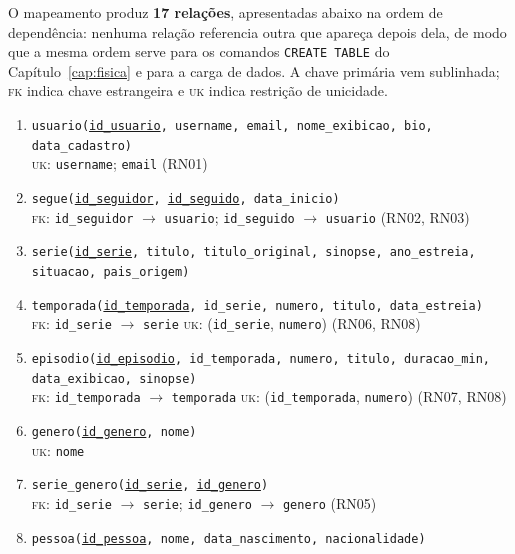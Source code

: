 \documentclass[a4paper,12pt,oneside,openany]{book}
\newcommand{\id}[1]{\texttt{#1}}
\begin{document}
O mapeamento produz \textbf{17 relações}, apresentadas abaixo na ordem de
dependência: nenhuma relação referencia outra que apareça depois dela, de modo que a
mesma ordem serve para os comandos \id{CREATE TABLE} do Capítulo~\ref{cap:fisica} e
para a carga de dados. A chave primária vem sublinhada; \textsc{fk} indica chave
estrangeira e \textsc{uk} indica restrição de unicidade.

\begin{enumerate}[leftmargin=2em]
    \item \id{usuario(\underline{id\_usuario}, username, email, nome\_exibicao, bio, data\_cadastro)}\\
    \textsc{uk}: \id{username}; \id{email} \hfill (RN01)

    \item \id{segue(\underline{id\_seguidor}, \underline{id\_seguido}, data\_inicio)}\\
    \textsc{fk}: \id{id\_seguidor} $\rightarrow$ \id{usuario}; \id{id\_seguido}
$\rightarrow$ \id{usuario} \hfill (RN02, RN03)

    \item \id{serie(\underline{id\_serie}, titulo, titulo\_original, sinopse,
ano\_estreia, situacao, pais\_origem)}

    \item \id{temporada(\underline{id\_temporada}, id\_serie, numero, titulo, data\_estreia)}\\
    \textsc{fk}: \id{id\_serie} $\rightarrow$ \id{serie} \quad \textsc{uk}:
(\id{id\_serie}, \id{numero}) \hfill (RN06, RN08)

    \item \id{episodio(\underline{id\_episodio}, id\_temporada, numero, titulo, duracao\_min, data\_exibicao, sinopse)}\\
    \textsc{fk}: \id{id\_temporada} $\rightarrow$ \id{temporada} \quad \textsc{uk}:
(\id{id\_temporada}, \id{numero}) \hfill (RN07, RN08)

    \item \id{genero(\underline{id\_genero}, nome)}\\
    \textsc{uk}: \id{nome}

    \item \id{serie\_genero(\underline{id\_serie}, \underline{id\_genero})}\\
    \textsc{fk}: \id{id\_serie} $\rightarrow$ \id{serie}; \id{id\_genero}
$\rightarrow$ \id{genero} \hfill (RN05)

    \item \id{pessoa(\underline{id\_pessoa}, nome, data\_nascimento, nacionalidade)}


\end{enumerate}
\end{document}
